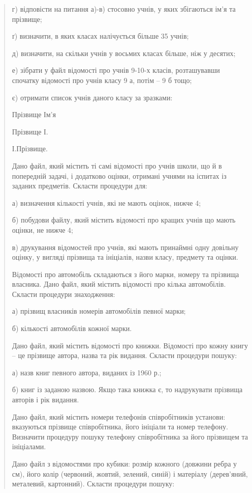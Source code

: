 \documentclass[]{article}
\begin{document}
\begin{quote}
г) відповісти на питання а)-в) стосовно учнів, у яких збігаються ім'я та
прізвище;

ґ) визначити, в яких класах налічується більше 35 учнів;

д) визначити, на скільки учнів у восьмих класах більше, ніж у десятих;

е) зібрати у файл відомості про учнів 9-10-х класів, розташувавши
спочатку відомості про учнів класу 9 а, потім -- 9 б тощо;

є) отримати список учнів даного класу за зразками:

Прізвище Ім'я

Прізвище І.

І.Прізвище.

Дано файл, який містить ті самі відомості про учнів школи, що й в
попередній задачі, і додатково оцінки, отримані учнями на іспитах із
заданих предметів. Скласти процедури для:

а) визначення кількості учнів, які не мають оцінок, нижче 4;

б) побудови файлу, який містить відомості про кращих учнів що мають
оцінки, не нижче 4;

в) друкування відомостей про учнів, які мають принаймні одну довільну
оцінку, у вигляді прізвища та ініціалів, назви класу, предмету та
оцінки.

Відомості про автомобіль складаються з його марки, номеру та прізвища
власника. Дано файл, який містить відомості про кілька автомобілів.
Скласти процедури знаходження:

а) прізвищ власників номерів автомобілів певної марки;

б) кількості автомобілів кожної марки.

Дано файл, який містить відомості про книжки. Відомості про кожну книгу
-- це прізвище автора, назва та рік видання. Скласти процедури пошуку:

а) назв книг певного автора, виданих із 1960 р.;

б) книг із заданою назвою. Якщо така книжка є, то надрукувати прізвища
авторів і рік видання.

Дано файл, який містить номери телефонів співробітників установи:
вказуються прізвище співробітника, його ініціали та номер телефону.
Визначити процедуру пошуку телефону співробітника за його прізвищем та
ініціалами.

Дано файл з відомостями про кубики: розмір кожного (довжини ребра у см),
його колір (червоний, жовтий, зелений, синій) і матеріалу (дерев'яний,
металевий, картонний). Скласти процедури пошуку:


\end{quote}
\end{document}
